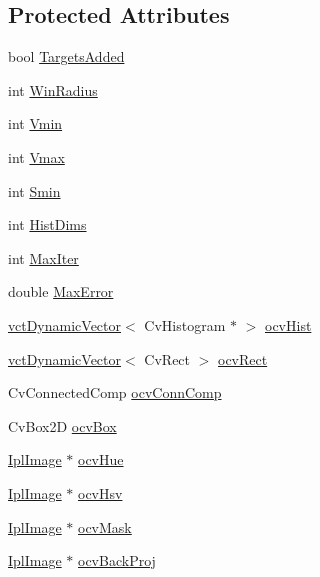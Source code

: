 \subsection*{Protected Attributes}
\begin{DoxyCompactItemize}
\item 
bool \hyperlink{classsvl_tracker_o_c_v_mean_shift_a2054ed2ac9e61dc68e1c8d5733452e38}{Targets\+Added}
\item 
int \hyperlink{classsvl_tracker_o_c_v_mean_shift_a33e7390d7ed52a9a2f784ac7bf6a7c56}{Win\+Radius}
\item 
int \hyperlink{classsvl_tracker_o_c_v_mean_shift_a819979074decd36baa5f75e0db95764b}{Vmin}
\item 
int \hyperlink{classsvl_tracker_o_c_v_mean_shift_aa30ea527e09f1642723f72b8052c4128}{Vmax}
\item 
int \hyperlink{classsvl_tracker_o_c_v_mean_shift_ac9580a13deb4e3ccaa171070a09b6b95}{Smin}
\item 
int \hyperlink{classsvl_tracker_o_c_v_mean_shift_a9a31cf37921c221d9aa82f0d5aeaaece}{Hist\+Dims}
\item 
int \hyperlink{classsvl_tracker_o_c_v_mean_shift_a72ce057b765f9a1f38d79651659b12fd}{Max\+Iter}
\item 
double \hyperlink{classsvl_tracker_o_c_v_mean_shift_a088ba363e76d5e1129a3db18f17d8a1e}{Max\+Error}
\item 
\hyperlink{classvct_dynamic_vector}{vct\+Dynamic\+Vector}$<$ Cv\+Histogram $\ast$ $>$ \hyperlink{classsvl_tracker_o_c_v_mean_shift_a91f614062a5d81f7baa035168705ee56}{ocv\+Hist}
\item 
\hyperlink{classvct_dynamic_vector}{vct\+Dynamic\+Vector}$<$ Cv\+Rect $>$ \hyperlink{classsvl_tracker_o_c_v_mean_shift_aef4078c2bb25bf33cbf01d1f1525545f}{ocv\+Rect}
\item 
Cv\+Connected\+Comp \hyperlink{classsvl_tracker_o_c_v_mean_shift_afbd5ec234b24bf1b561ebf0c66761d79}{ocv\+Conn\+Comp}
\item 
Cv\+Box2\+D \hyperlink{classsvl_tracker_o_c_v_mean_shift_af704a1f15a4ff13d0c1b052b74589ffe}{ocv\+Box}
\item 
\hyperlink{svl_types_8h_aa5a40a13021ba9708bfe921e18fdfa53}{Ipl\+Image} $\ast$ \hyperlink{classsvl_tracker_o_c_v_mean_shift_a84665b7a5ea0d434fda0555c01456bb7}{ocv\+Hue}
\item 
\hyperlink{svl_types_8h_aa5a40a13021ba9708bfe921e18fdfa53}{Ipl\+Image} $\ast$ \hyperlink{classsvl_tracker_o_c_v_mean_shift_aea791761a2b3163716626b33ac3965cd}{ocv\+Hsv}
\item 
\hyperlink{svl_types_8h_aa5a40a13021ba9708bfe921e18fdfa53}{Ipl\+Image} $\ast$ \hyperlink{classsvl_tracker_o_c_v_mean_shift_ad5f62155accaa1529eca7ee87bf2df54}{ocv\+Mask}
\item 
\hyperlink{svl_types_8h_aa5a40a13021ba9708bfe921e18fdfa53}{Ipl\+Image} $\ast$ \hyperlink{classsvl_tracker_o_c_v_mean_shift_a4d006bede9016ce5596552d3c3b118b9}{ocv\+Back\+Proj}
\end{DoxyCompactItemize}


